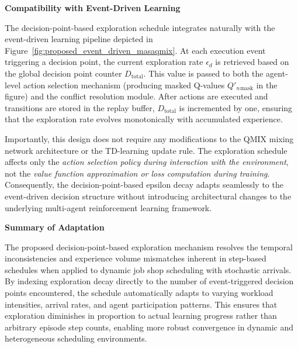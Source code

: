 \textbf{Compatibility with Event-Driven Learning}

The decision-point-based exploration schedule integrates naturally with the event-driven learning pipeline depicted in Figure~\ref{fig:proposed_event_driven_masaqmix}. At each execution event triggering a decision point, the current exploration rate $\epsilon_d$ is retrieved based on the global decision point counter $D_{\text{total}}$. This value is passed to both the agent-level action selection mechanism (producing masked Q-values $Q'_n{}_{\text{mask}}$ in the figure) and the conflict resolution module. After actions are executed and transitions are stored in the replay buffer, $D_{\text{total}}$ is incremented by one, ensuring that the exploration rate evolves monotonically with accumulated experience.

Importantly, this design does not require any modifications to the QMIX mixing network architecture or the TD-learning update rule. The exploration schedule affects only the \textit{action selection policy during interaction with the environment}, not the \textit{value function approximation or loss computation during training}. Consequently, the decision-point-based epsilon decay adapts seamlessly to the event-driven decision structure without introducing architectural changes to the underlying multi-agent reinforcement learning framework.

\textbf{Summary of Adaptation}

The proposed decision-point-based exploration mechanism resolves the temporal inconsistencies and experience volume mismatches inherent in step-based schedules when applied to dynamic job shop scheduling with stochastic arrivals. By indexing exploration decay directly to the number of event-triggered decision points encountered, the schedule automatically adapts to varying workload intensities, arrival rates, and agent participation patterns. This ensures that exploration diminishes in proportion to actual learning progress rather than arbitrary episode step counts, enabling more robust convergence in dynamic and heterogeneous scheduling environments.
